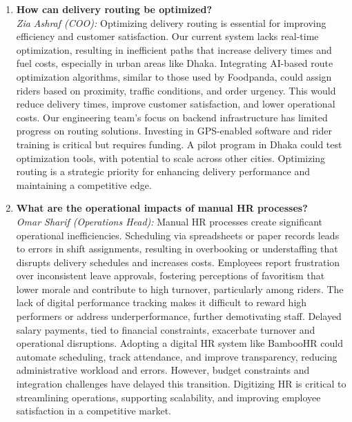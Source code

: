 \documentclass[12pt,a4paper]{article}
\begin{document}
\begin{enumerate}
    \item \textbf{How can delivery routing be optimized?} \\
    \textit{Zia Ashraf (COO):} Optimizing delivery routing is essential for improving efficiency and customer satisfaction. Our current system lacks real-time optimization, resulting in inefficient paths that increase delivery times and fuel costs, especially in urban areas like Dhaka. Integrating AI-based route optimization algorithms, similar to those used by Foodpanda, could assign riders based on proximity, traffic conditions, and order urgency. This would reduce delivery times, improve customer satisfaction, and lower operational costs. Our engineering team’s focus on backend infrastructure has limited progress on routing solutions. Investing in GPS-enabled software and rider training is critical but requires funding. A pilot program in Dhaka could test optimization tools, with potential to scale across other cities. Optimizing routing is a strategic priority for enhancing delivery performance and maintaining a competitive edge.

    \item \textbf{What are the operational impacts of manual HR processes?} \\
    \textit{Omar Sharif (Operations Head):} Manual HR processes create significant operational inefficiencies. Scheduling via spreadsheets or paper records leads to errors in shift assignments, resulting in overbooking or understaffing that disrupts delivery schedules and increases costs. Employees report frustration over inconsistent leave approvals, fostering perceptions of favoritism that lower morale and contribute to high turnover, particularly among riders. The lack of digital performance tracking makes it difficult to reward high performers or address underperformance, further demotivating staff. Delayed salary payments, tied to financial constraints, exacerbate turnover and operational disruptions. Adopting a digital HR system like BambooHR could automate scheduling, track attendance, and improve transparency, reducing administrative workload and errors. However, budget constraints and integration challenges have delayed this transition. Digitizing HR is critical to streamlining operations, supporting scalability, and improving employee satisfaction in a competitive market.


\end{enumerate}
\end{document}
